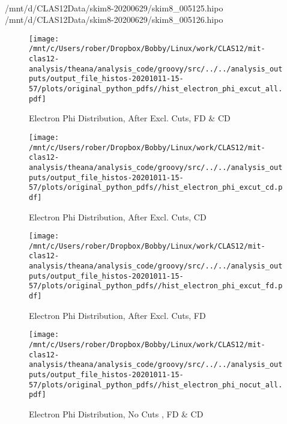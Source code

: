 \documentclass{article}
\begin{document}
\\/mnt/d/CLAS12Data/skim8-20200629/skim8\_005125.hipo 
\\/mnt/d/CLAS12Data/skim8-20200629/skim8\_005126.hipo 
\\\clearpage 
\listoffigures
\clearpage
\begin{landscape}

    \begin{figure}[h]
        \centering

        \texttt{[image: /mnt/c/Users/rober/Dropbox/Bobby/Linux/work/CLAS12/mit-clas12-analysis/theana/analysis\_code/groovy/src/../../analysis\_outputs/output\_file\_histos-20201011-15-57/plots/original\_python\_pdfs//hist\_electron\_phi\_excut\_all.pdf]}
        \captionsetup{textformat=empty,labelformat=blank}
        \caption{Electron Phi Distribution, After Excl. Cuts, FD \& CD}
    \end{figure}
    \clearpage
    
    \begin{figure}[h]
        \centering

        \texttt{[image: /mnt/c/Users/rober/Dropbox/Bobby/Linux/work/CLAS12/mit-clas12-analysis/theana/analysis\_code/groovy/src/../../analysis\_outputs/output\_file\_histos-20201011-15-57/plots/original\_python\_pdfs//hist\_electron\_phi\_excut\_cd.pdf]}
        \captionsetup{textformat=empty,labelformat=blank}
        \caption{Electron Phi Distribution, After Excl. Cuts, CD}
    \end{figure}
    \clearpage
    
    \begin{figure}[h]
        \centering

        \texttt{[image: /mnt/c/Users/rober/Dropbox/Bobby/Linux/work/CLAS12/mit-clas12-analysis/theana/analysis\_code/groovy/src/../../analysis\_outputs/output\_file\_histos-20201011-15-57/plots/original\_python\_pdfs//hist\_electron\_phi\_excut\_fd.pdf]}
        \captionsetup{textformat=empty,labelformat=blank}
        \caption{Electron Phi Distribution, After Excl. Cuts, FD}
    \end{figure}
    \clearpage
    
    \begin{figure}[h]
        \centering

        \texttt{[image: /mnt/c/Users/rober/Dropbox/Bobby/Linux/work/CLAS12/mit-clas12-analysis/theana/analysis\_code/groovy/src/../../analysis\_outputs/output\_file\_histos-20201011-15-57/plots/original\_python\_pdfs//hist\_electron\_phi\_nocut\_all.pdf]}
        \captionsetup{textformat=empty,labelformat=blank}
        \caption{Electron Phi Distribution, No Cuts , FD \& CD}
    \end{figure}
    \clearpage
    

\end{landscape}
\end{document}
